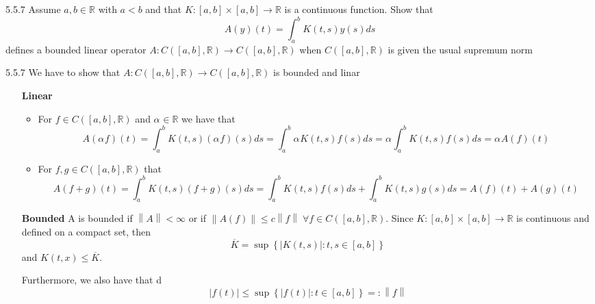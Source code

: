 \documentclass[a4paper,norsk]{article}
\renewcommand{\leq}{\leqslant}
\begin{document}
\begin{oppgavebox}{5.5.7}{}
Assume $ a, b \in  \mathbb{R} $ with $ a < b $ and that $ K : \left[ a, b \right] \times \left[ a, b \right] \to \mathbb{R}  $ is a continuous function. Show that
\[
    A(y)(t) = \int_{a}^{b} K(t, s) y(s) ds 
\]
defines a bounded linear operator $ A : C \left( \left[ a, b \right] , \mathbb{R} \right) \to C \left( \left[ a, b \right] , \mathbb{R} \right)   $ when $ C \left( \left[ a, b \right] , \mathbb{R} \right)  $ is given the usual supremum norm

\begin{proofbox}{5.5.7}{}
    We have to show that $ A : C \left( \left[ a, b \right] , \mathbb{R} \right) \to C \left( \left[ a, b \right] , \mathbb{R} \right) $ is bounded and linar
    \begin{itemize}
        \item[\textbf{Linear}] 
        \begin{itemize}
            \item For $ f \in C \left( \left[ a, b \right] , \mathbb{R} \right)  $ and $ \alpha_{}^{} \in  \mathbb{R} $ we have that
            \[
                A(\alpha_{}^{} f)(t) = \int_{a}^{b} K(t, s) \left( \alpha_{}^{} f \right) (s) ds = \int_{a}^{b} \alpha_{}^{} K(t, s) f(s) ds = \alpha_{}^{} \int_{a}^{b} K(t, s) f(s) ds = \alpha_{}^{} A(f)(t)        
            \]
            \item For $ f, g \in C \left( \left[ a, b \right] , \mathbb{R} \right)  $ that
            \[
                A(f + g)(t) = \int_{a}^{b} K(t, s) \left( f+g \right) (s) ds = \int_{a}^{b} K(t, s) f(s) ds + \int_{a}^{b} K(t, s) g(s) ds = A(f)(t) + A(g)(t)   
            \]
            
            
        \end{itemize}
        \item[\textbf{Bounded}]
        A is bounded if $ \left\lVert A \right\rVert < \infty $ or if $ \left\lVert A(f)  \right\rVert \leq c \left\lVert f \right\rVert \; \forall f \in  C \left( \left[ a, b \right] , \mathbb{R} \right)   $. Since $ K : \left[ a, b \right] \times \left[ a, b \right] \to \mathbb{R} $ is continuous and defined on a compact set, then
        \[
            \overline{K} = \sup \left\{ \left| K(t, s) \right| : t, s \in \left[ a, b \right]   \right\} 
        \]
        and $ K(t, x) \leq \overline{K} $.
        
        Furthermore, we also have that d
        \[
            \left| f(t) \right|  \leq \sup \left\{ \left| f(t) \right| : t \in \left[ a, b \right]  \right\} =: \left\lVert f \right\rVert 
        \]
        

\end{itemize}
\end{proofbox}
\end{oppgavebox}
\end{document}

